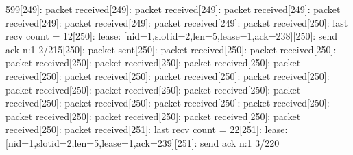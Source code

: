 \documentclass[parskip]{cs4rep}
\begin{document}
599[249]: packet received[249]: packet received[249]: packet received[249]: packet received[249]: packet received[249]: packet received[249]: packet received[250]: last recv count = 12[250]: lease: [nid=1,slotid=2,len=5,lease=1,ack=238][250]: send ack n:1 2/215[250]: packet sent[250]: packet received[250]: packet received[250]: packet received[250]: packet received[250]: packet received[250]: packet received[250]: packet received[250]: packet received[250]: packet received[250]: packet received[250]: packet received[250]: packet received[250]: packet received[250]: packet received[250]: packet received[250]: packet received[250]: packet received[250]: packet received[250]: packet received[250]: packet received[250]: packet received[251]: last recv count = 22[251]: lease: [nid=1,slotid=2,len=5,lease=1,ack=239][251]: send ack n:1 3/220\newline
\end{document}

